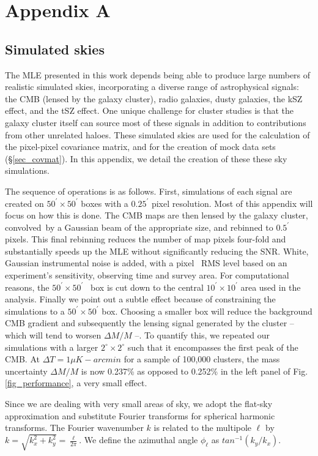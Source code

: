 \chapter{Appendix A}
\section{Simulated skies}
\label{sec_appendix_simulated_skies}
The MLE presented in this work depends being able to produce large numbers of realistic simulated skies, incorporating a diverse range of astrophysical signals: the CMB (lensed by the galaxy cluster), radio galaxies, dusty galaxies, the kSZ effect, and the tSZ effect.
One unique challenge for cluster studies is that the galaxy cluster itself can source most of these signals in addition to contributions from other unrelated haloes. These simulated skies are used for the calculation of the pixel-pixel covariance matrix, and for the creation of mock data sets (\S\ref{sec_covmat}). In this appendix, we detail the creation of these these sky simulations.

The sequence of operations is as follows. First, simulations of each signal are created on $50^\prime \times 50^\prime$ boxes with a $0.25^\prime$ pixel resolution. Most of this appendix will focus on how this is done. The CMB maps are then lensed by the galaxy cluster, convolved\
 by a Gaussian beam of the appropriate size, and rebinned to $0.5^\prime$ pixels. This final rebinning reduces the number of map pixels four-fold and substantially speeds up the MLE without significantly reducing the SNR. White, Gaussian instrumental noise is added, with a pixel \
RMS level based on an experiment's sensitivity, observing time and survey area. For computational reasons, the $50^\prime \times 50^\prime$ \
box is cut down to the central $10^\prime \times 10^\prime$ area used in the analysis. Finally we point out a subtle effect because of constraining the simulations to a $50^\prime \times 50^\prime$ box. Choosing a smaller box will reduce the background CMB gradient and subsequently the lensing signal generated by the cluster -- which will tend to worsen $\Delta M/M$ --. To quantify this, we repeated our simulations with a larger $2^{\circ} \times 2^{\circ}$ such that it encompasses the first peak of the CMB. At $\Delta T = 1 \mu K-arcmin$ for a sample of
 100,000 clusters, the mass uncertainty $\Delta M/M$ is now 0.237\% as opposed to 0.252\% in the left panel of Fig. \ref{fig_performance}, a very small effect.

Since we are dealing with very small areas of sky, we adopt the flat-sky approximation and substitute Fourier transforms for spherical harmonic transforms. The Fourier wavenumber $k$ is related to the multipole $\ell$ by $k = \sqrt{k_x^{2} + k_y^{2}} = \frac{\ell}{2\pi}$. We define the azimuthal angle $\phi_{\ell}$ as $tan^{-1}(k_{y} / k_x)$.
